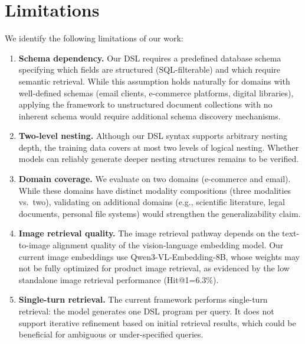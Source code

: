 \documentclass[11pt]{article}
\begin{document}
\section{Limitations}
\label{sec:limitations}

We identify the following limitations of our work:

\begin{enumerate}[leftmargin=*,nosep]
\item \textbf{Schema dependency.} Our DSL requires a predefined database schema specifying which fields are structured (SQL-filterable) and which require semantic retrieval. While this assumption holds naturally for domains with well-defined schemas (email clients, e-commerce platforms, digital libraries), applying the framework to unstructured document collections with no inherent schema would require additional schema discovery mechanisms.

\item \textbf{Two-level nesting.} Although our DSL syntax supports arbitrary nesting depth, the training data covers at most two levels of logical nesting. Whether models can reliably generate deeper nesting structures remains to be verified.

\item \textbf{Domain coverage.} We evaluate on two domains (e-commerce and email). While these domains have distinct modality compositions (three modalities vs.\ two), validating on additional domains (e.g., scientific literature, legal documents, personal file systems) would strengthen the generalizability claim.

\item \textbf{Image retrieval quality.} The image retrieval pathway depends on the text-to-image alignment quality of the vision-language embedding model. Our current image embeddings use Qwen3-VL-Embedding-8B, whose weights may not be fully optimized for product image retrieval, as evidenced by the low standalone image retrieval performance (Hit@1=6.3\%).

\item \textbf{Single-turn retrieval.} The current framework performs single-turn retrieval: the model generates one DSL program per query. It does not support iterative refinement based on initial retrieval results, which could be beneficial for ambiguous or under-specified queries.
\end{enumerate}




\end{document}
